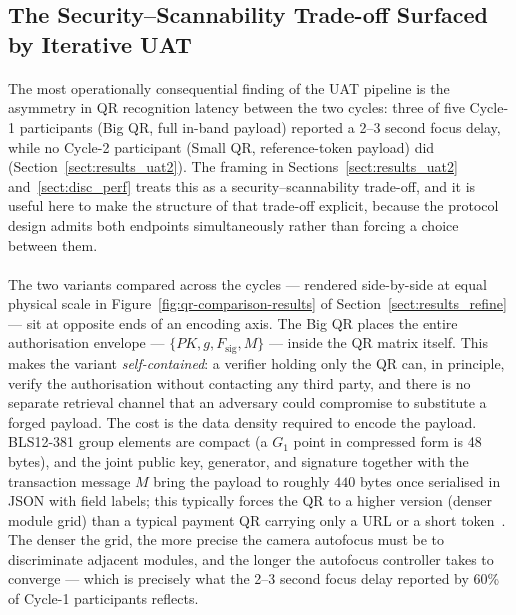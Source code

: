 \subsection{The Security--Scannability Trade-off Surfaced by Iterative UAT}
\label{sect:disc_qr}

\paragraph{}The most operationally consequential finding of the UAT pipeline is the asymmetry in QR recognition latency between the two cycles: three of five Cycle-1 participants (Big QR, full in-band payload) reported a 2--3 second focus delay, while no Cycle-2 participant (Small QR, reference-token payload) did (Section~\ref{sect:results_uat2}). The framing in Sections~\ref{sect:results_uat2} and~\ref{sect:disc_perf} treats this as a security--scannability trade-off, and it is useful here to make the structure of that trade-off explicit, because the protocol design admits both endpoints simultaneously rather than forcing a choice between them.

\paragraph{}The two variants compared across the cycles --- rendered side-by-side at equal physical scale in Figure~\ref{fig:qr-comparison-results} of Section~\ref{sect:results_refine} --- sit at opposite ends of an encoding axis. The Big QR places the entire authorisation envelope --- $\{PK, g, F_{\text{sig}}, M\}$ --- inside the QR matrix itself. This makes the variant \textit{self-contained}: a verifier holding only the QR can, in principle, verify the authorisation without contacting any third party, and there is no separate retrieval channel that an adversary could compromise to substitute a forged payload. The cost is the data density required to encode the payload. BLS12-381 group elements are compact (a $G_1$ point in compressed form is 48 bytes), and the joint public key, generator, and signature together with the transaction message $M$ bring the payload to roughly $440$ bytes once serialised in JSON with field labels; this typically forces the QR to a higher version (denser module grid) than a typical payment QR carrying only a URL or a short token~\cite{worldbank2021ch5, corpuz2025}. The denser the grid, the more precise the camera autofocus must be to discriminate adjacent modules, and the longer the autofocus controller takes to converge --- which is precisely what the 2--3 second focus delay reported by 60\% of Cycle-1 participants reflects.

